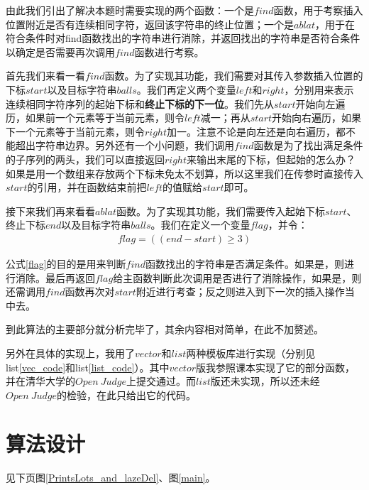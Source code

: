 \documentclass[UTF8]{ctexart}
\begin{document}
	\indent 由此我们引出了解决本题时需要实现的两个函数：一个是$find$函数，用于考察插入位置附近是否有连续相同字符，返回该字符串的终止位置；一个是$ablat$，用于在符合条件时对find函数找出的字符串进行消除，并返回找出的字符串是否符合条件以确定是否需要再次调用$find$函数进行考察。
	
	\indent 首先我们来看一看$find$函数。为了实现其功能，我们需要对其传入参数插入位置的下标$start$以及目标字符串$balls$。我们再定义两个变量$left$和$right$，分别用来表示连续相同字符序列的起始下标和\textbf{终止下标的下一位}。我们先从$start$开始向左遍历，如果前一个元素等于当前元素，则令$left$减一；再从$start$开始向右遍历，如果下一个元素等于当前元素，则令$right$加一。注意不论是向左还是向右遍历，都不能超出字符串边界。另外还有一个小问题，我们调用$find$函数是为了找出满足条件的子序列的两头，我们可以直接返回$right$来输出末尾的下标，但起始的怎么办？如果是用一个数组来存放两个下标未免太不划算，所以这里我们在传参时直接传入$start$的引用，并在函数结束前把$left$的值赋给$start$即可。
	
	\indent 接下来我们再来看看$ablat$函数。为了实现其功能，我们需要传入起始下标$start$、终止下标$end$以及目标字符串$balls$。我们在定义一个变量$flag$，并令：
	\begin{align}
	flag = ((end - start) \geq 3) \label{flag}
	\end{align}
	
	\indent 公式\ref{flag}的目的是用来判断$find$函数找出的字符串是否满足条件。如果是，则进行消除。最后再返回$flag$给主函数判断此次调用是否进行了消除操作，如果是，则还需调用$find$函数再次对$start$附近进行考查；反之则进入到下一次的插入操作当中去。
	
	\indent 到此算法的主要部分就分析完毕了，其余内容相对简单，在此不加赘述。
	
	\indent 另外在具体的实现上，我用了$vector$和$list$两种模板库进行实现（分别见list\ref{vec_code}和list\ref{list_code}）。其中$vector$版我参照课本\cite{data_structure}实现了它的部分函数，并在清华大学的$Open\ Judge$上提交通过。而$list$版还未实现，所以还未经$Open\ Judge$的检验，在此只给出它的代码。
	\section{算法设计}
	见下页图\ref{PrintsLots_and_lazeDel}、图\ref{main}。
\end{document}
